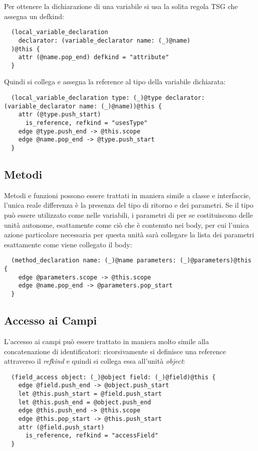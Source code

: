 Per ottenere la dichiarazione di una variabile si usa la solita regola TSG che assegna un defkind:

\begin{lstlisting}
  (local_variable_declaration
    declarator: (variable_declarator name: (_)@name)
  )@this {
    attr (@name.pop_end) defkind = "attribute"
  }
\end{lstlisting}

Quindi si collega e assegna la reference al tipo della variabile dichiarata:

\begin{lstlisting}
  (local_variable_declaration type: (_)@type declarator: (variable_declarator name: (_)@name))@this {
    attr (@type.push_start)
      is_reference, refkind = "usesType"
    edge @type.push_end -> @this.scope
    edge @name.pop_end -> @type.push_start
  }
\end{lstlisting}

\subsection{Metodi}

Metodi e funzioni possono essere trattati in maniera simile a classe e interfaccie, l'unica reale differenza \`e la presenza del tipo di ritorno e dei parametri.
Se il tipo pu\`o essere utilizzato come nelle variabili, i parametri di per se costituiscono delle unit\`a autonome, esattamente come ci\`o che \`e contenuto nei body, per cui l'unica azione particolare necessaria per questa unit\`a sar\`a collegare la lista dei parametri esattamente come viene collegato il body:

\begin{lstlisting}
  (method_declaration name: (_)@name parameters: (_)@parameters)@this {
    edge @parameters.scope -> @this.scope
    edge @name.pop_end -> @parameters.pop_start
  }
\end{lstlisting}

\subsection{Accesso ai Campi}
L'accesso ai campi pu\`o essere trattato in maniera molto simile alla concatenazione di identificatori: ricorsivamente si definisce una reference attraverso il \emph{refkind} e quindi si collega essa all'unit\`a \emph{object}:

\begin{lstlisting}
  (field_access object: (_)@object field: (_)@field)@this {
    edge @field.push_end -> @object.push_start
    let @this.push_start = @field.push_start
    let @this.push_end = @object.push_end
    edge @this.push_end -> @this.scope
    edge @this.pop_start -> @this.push_start
    attr (@field.push_start)
      is_reference, refkind = "accessField"
  }
\end{lstlisting}


